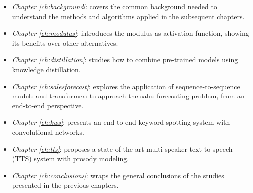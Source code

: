 \begin{itemize}
	\item \textit{Chapter \ref{ch:background}}: covers the common background needed to understand the methods and algorithms applied in the subsequent chapters.
	\item \textit{Chapter \ref{ch:modulus}}: introduces the modulus as activation function, showing its benefits over other alternatives.
	\item \textit{Chapter \ref{ch:distillation}}: studies how to combine pre-trained models using knowledge distillation.
	\item \textit{Chapter \ref{ch:salesforecast}}: explores the application of sequence-to-sequence models and transformers to approach the sales forecasting problem, from an end-to-end perspective. 
	\item \textit{Chapter \ref{ch:kws}}: presents an end-to-end keyword spotting system with convolutional networks.
	\item \textit{Chapter \ref{ch:tts}}: proposes a state of the art multi-speaker text-to-speech (TTS) system with prosody modeling.
	\item \textit{Chapter \ref{ch:conclusions}}: wraps the general conclusions of the studies presented in the previous chapters.
\end{itemize}


     


